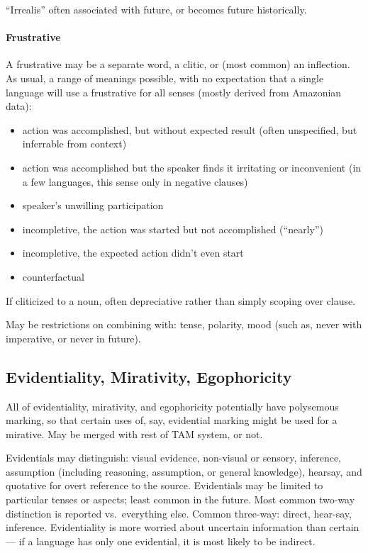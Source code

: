 \documentclass[11pt]{article}
\newenvironment{grammarlist}%
 {\begin{itemize}\addtolength{\itemsep}{-0.5\baselineskip}\ignorespaces}%
 {\end{itemize}\ignorespacesafterend}
\begin{document}
``Irrealis'' often associated with future, or becomes future
historically. 


\paragraph{Frustrative}
A frustrative may be a separate word, a clitic, or (most common) an
inflection.  As usual, a range of meanings possible, with no
expectation that a single language will use a frustrative for all
senses (mostly derived from Amazonian data):

\begin{grammarlist}
  \item action was accomplished, but without expected result (often
    unspecified, but inferrable from context)
  \item action was accomplished but the speaker finds it irritating or
    inconvenient (in a few languages, this sense only in negative clauses)
  \item speaker's unwilling participation
  \item incompletive, the action was started but not accomplished
    (``nearly'') 
  \item incompletive, the expected action didn't even start
  \item counterfactual
\end{grammarlist}

If cliticized to a noun, often depreciative rather than simply scoping
over clause.

May be restrictions on combining with: tense, polarity, mood (such as,
never with imperative, or never in future).


\subsection{Evidentiality, Mirativity, Egophoricity}
All of evidentiality, mirativity, and egophoricity potentially have
polysemous marking, so that certain uses of, say, evidential marking
might be used for a mirative.  May be merged with rest of TAM system,
or not.

Evidentials may distinguish: visual evidence, non-visual or sensory,
inference, assumption (including reasoning, assumption, or general
knowledge), hearsay, and quotative for overt reference to the source.
Evidentials may be limited to particular tenses or aspects; least
common in the future.  Most common two-way distinction is reported
vs.\ everything else.  Common three-way: direct, hear-say, inference.
Evidentiality is more worried about uncertain information than certain
— if a language has only one evidential, it is most likely to be
indirect. 
\end{document}
